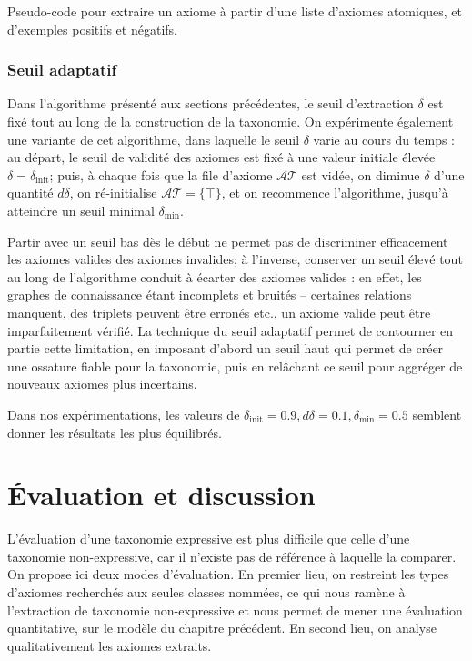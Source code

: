 \begin{algorithm}[h]
 \caption{Pseudo-code pour extraire un axiome à partir d'une liste d'axiomes atomiques, et d'exemples positifs et négatifs.}
 \label{algo:extraction}
\end{algorithm}

\FloatBarrier

\subsubsection{Seuil adaptatif}


Dans l'algorithme présenté aux sections précédentes, le seuil d'extraction $\delta$ est fixé tout au long de la construction de la taxonomie.
On expérimente également une variante de cet algorithme,
dans laquelle le seuil $\delta$ varie au cours du temps : au départ, le seuil de validité des axiomes est fixé à une valeur initiale élevée $\delta = \delta_\text{init}$; puis, à chaque fois que la file d'axiome $\mathcal{AT}$ est vidée, on diminue $\delta$ d'une quantité $d\delta$, on ré-initialise $\mathcal{AT} = \{ \top \}$, et on recommence l'algorithme, jusqu'à atteindre un seuil minimal $\delta_\text{min}$. 

Partir avec un seuil bas dès le début ne permet pas de discriminer efficacement les axiomes valides des axiomes invalides; à l'inverse, conserver un seuil élevé tout au long de l'algorithme conduit à écarter des axiomes valides : en effet, les graphes de connaissance étant incomplets et bruités – certaines relations manquent, des triplets peuvent être erronés etc., un axiome valide peut être imparfaitement vérifié. La technique du seuil adaptatif permet de contourner en partie cette limitation, en imposant d'abord un seuil haut qui permet de créer une ossature fiable pour la taxonomie, puis en relâchant ce seuil pour aggréger de nouveaux axiomes plus incertains.

Dans nos expérimentations, les valeurs de $\delta_\text{init} = 0.9, d\delta = 0.1, \delta_\text{min} = 0.5$ semblent donner les résultats les plus équilibrés.
\section{Évaluation et discussion}
\label{sec:texp-results}

L'évaluation d'une taxonomie expressive est plus difficile
que celle d'une taxonomie non-expressive, car il n'existe pas de référence à laquelle la comparer. On propose ici deux modes d'évaluation. En premier lieu, on restreint les types d'axiomes recherchés aux seules classes nommées, ce qui nous ramène à l'extraction de taxonomie non-expressive et nous permet de mener une évaluation quantitative, sur le modèle du chapitre précédent. %
En second lieu, on analyse qualitativement les axiomes extraits.


